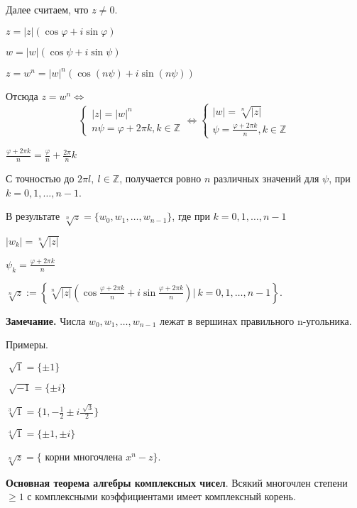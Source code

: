 Далее считаем, что $z \neq 0$.

$z = |z|(\cos \varphi + i \sin \varphi)$

$w = |w|(\cos \psi + i \sin \psi)$

$z = w^n = |w|^n (\cos (n \psi) + i \sin (n \psi))$

Отсюда $z = w^n \Leftrightarrow$ \[
	\left\{
		\begin{aligned}
			|z| = |w|^n  \\
			n \psi = \varphi + 2 \pi k, k \in \mathbb{Z} 
		\end{aligned}
	\right. \Leftrightarrow \left\{
		\begin{aligned}
			|w| = \sqrt[n]{|z|}  \\
			\psi = \frac{\varphi + 2 \pi k}{n}, k \in \mathbb{Z}
		\end{aligned}
	\right.
\]

$\frac{\varphi + 2 \pi k}{n} = \frac{\varphi}{n} + \frac{2 \pi}{n} k$

С точностью до $2 \pi l, \ l \in \mathbb{Z}$, получается ровно $n$ различных значений для $\psi$, при $k = 0,1, \dots, n-1$.

В результате $\sqrt[n]{z} = \{w_0, w_1, \dots, w_{n-1} \}$, где при $k = 0, 1, \dots, n-1$ 

$|w_k| = \sqrt[n]{|z|}$

$\psi_k = \frac{\varphi + 2 \pi k}{n}$

\vspace{\baselineskip}
$\sqrt[n]{z} := \left\{ \sqrt[n]{|z|} \left( \cos \frac{\varphi + 2 \pi k}{n} + i \sin \frac{\varphi + 2 \pi k}{n} \right) | \ k = 0, 1, \dots, n-1  \right\}$.

\vspace{\baselineskip}
\textbf{Замечание.} Числа $w_0, w_1, \dots, w_{n-1}$ лежат в вершинах правильного n-угольника.

\vspace{\baselineskip}
Примеры. 

$\sqrt[]{1} = \{\pm 1\}$

$\sqrt[]{-1} = \{\pm i\}$

$\sqrt[3]{1} = \{1, -\frac{1}{2} \pm i \frac{\sqrt[]{3}}{2} \}$

$\sqrt[4]{1} = \{ \pm 1, \pm i \}$

\vspace{\baselineskip}
$\sqrt[n]{z} = \{$ корни многочлена $x^n - z \}$.

\vspace{\baselineskip}
\textbf{Основная теорема алгебры комплексных чисел}. Всякий многочлен степени $\geq 1$ с комплексными коэффициентами имеет комплексный корень.

